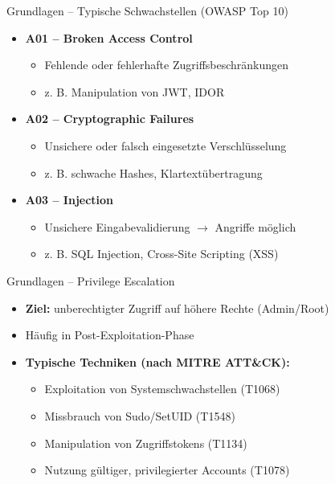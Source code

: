 \documentclass[
	aspectratio=169,	%
	onlytextwidth,		%
	t,					%
	]{beamer}
\begin{document}
\begin{frame}{Grundlagen – Typische Schwachstellen (OWASP Top 10)}
	\begin{itemize}
		\item \textbf{A01 – Broken Access Control}  
		\begin{itemize}
			\item Fehlende oder fehlerhafte Zugriffsbeschränkungen
			\item z. B. Manipulation von JWT, IDOR
		\end{itemize}
		
		\item \textbf{A02 – Cryptographic Failures}  
		\begin{itemize}
			\item Unsichere oder falsch eingesetzte Verschlüsselung
			\item z. B. schwache Hashes, Klartextübertragung
		\end{itemize}
		
		\item \textbf{A03 – Injection}  
		\begin{itemize}
			\item Unsichere Eingabevalidierung $\rightarrow$ Angriffe möglich
			\item z. B. SQL Injection, Cross-Site Scripting (XSS)
		\end{itemize}
	\end{itemize}
\end{frame}


\begin{frame}{Grundlagen – Privilege Escalation}
	\begin{itemize}
		\item \textbf{Ziel:} unberechtigter Zugriff auf höhere Rechte (Admin/Root)
		\item Häufig in Post-Exploitation-Phase
		\item \textbf{Typische Techniken (nach MITRE ATT\&CK):}
		\begin{itemize}
			\item Exploitation von Systemschwachstellen (T1068)
			\item Missbrauch von Sudo/SetUID (T1548)
			\item Manipulation von Zugriffstokens (T1134)
			\item Nutzung gültiger, privilegierter Accounts (T1078)
		\end{itemize}
	\end{itemize}
\end{frame}
\end{document}
